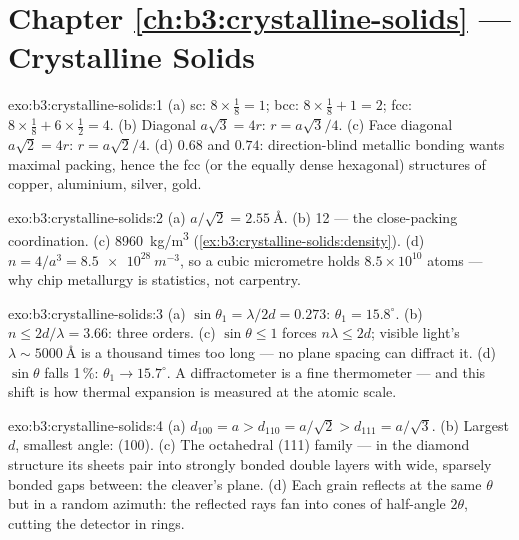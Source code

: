 \section*{Chapter \ref{ch:b3:crystalline-solids} --- Crystalline Solids}

\begin{solution}{exo:b3:crystalline-solids:1}
(a) sc: $8\times\tfrac18 = 1$; bcc: $8\times\tfrac18 + 1 = 2$;
fcc: $8\times\tfrac18 + 6\times\tfrac12 = 4$. (b) Diagonal
$a\sqrt3 = 4r$: $r = a\sqrt3/4$. (c) Face diagonal $a\sqrt2 = 4r$:
$r = a\sqrt2/4$. (d) $0.68$ and $0.74$: direction-blind metallic
bonding wants maximal packing, hence the fcc (or the equally dense
hexagonal) structures of copper, aluminium, silver, gold.
\end{solution}

\begin{solution}{exo:b3:crystalline-solids:2}
(a) $a/\sqrt2 = \qty{2.55}{\angstrom}$. (b) 12 --- the
close-packing coordination. (c) \qty{8960}{kg/m^3}
(\cref{ex:b3:crystalline-solids:density}). (d) $n = 4/a^3 =
\qty{8.5e28}{m^{-3}}$, so a cubic micrometre holds
$8.5\times10^{10}$ atoms --- why chip metallurgy is
statistics, not carpentry.
\end{solution}

\begin{solution}{exo:b3:crystalline-solids:3}
(a) $\sin\theta_1 = \lambda/2d = 0.273$: $\theta_1 =
15.8^\circ$. (b) $n \le 2d/\lambda = 3.66$: three orders. (c)
$\sin\theta \le 1$ forces $n\lambda \le 2d$; visible light's
$\lambda \sim \qty{5000}{\angstrom}$ is a thousand times too long
--- no  plane spacing can diffract it. (d) $\sin\theta$
falls 1\,\%: $\theta_1 \to 15.7^\circ$. A diffractometer is a fine
thermometer --- and this shift is how thermal expansion is
measured at the atomic scale.
\end{solution}

\begin{solution}{exo:b3:crystalline-solids:4}
(a) $d_{100} = a > d_{110} = a/\sqrt2 > d_{111} = a/\sqrt3$. (b)
Largest $d$, smallest angle: (100). (c) The octahedral (111)
family --- in the diamond structure its sheets pair into strongly
bonded double layers with wide, sparsely bonded gaps between:
the cleaver's plane. (d) Each grain reflects at the same $\theta$
but in a random azimuth: the reflected rays fan into cones of
half-angle $2\theta$, cutting the detector in rings.
\end{solution}

